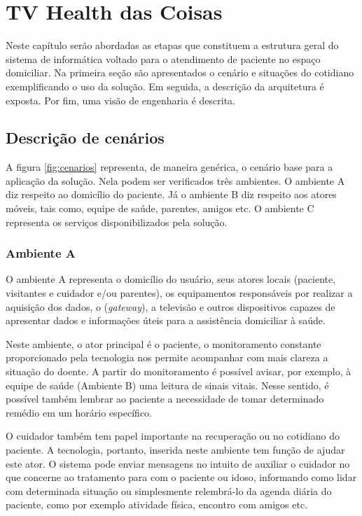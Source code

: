 \chapter{TV Health das Coisas}\label{cap:quatro}

Neste capítulo serão abordadas as etapas que constituem a estrutura geral do
sistema de informática voltado para o atendimento de paciente no espaço domiciliar. 
Na primeira seção são apresentados o cenário e situações do cotidiano exemplificando
o uso da solução. Em seguida, a descrição da arquitetura é exposta. Por fim, uma
visão de engenharia é descrita.

\section{Descrição de cenários}

A figura \ref{fig:cenarios} representa, de maneira genérica, o cenário base
para a aplicação da solução. Nela podem ser verificados três ambientes. O
ambiente A diz respeito ao domicílio do paciente. Já o ambiente B diz respeito
aos atores móveis, tais como, equipe de saúde, parentes, amigos etc. O ambiente
C representa os serviços disponibilizados pela solução.


\subsection{Ambiente A} \label{subsec:ambiente-a}

O ambiente A representa o domicílio do usuário, seus atores locais (paciente,
visitantes e cuidador e/ou parentes), os equipamentos responsáveis por  realizar
a aquisição dos dados, o \stb[] (\textit{gateway}), a televisão e outros
dispositivos capazes de apresentar dados e informações úteis para a assistência
domiciliar à saúde.

Neste ambiente, o ator principal é o paciente, o monitoramento constante 
proporcionado pela tecnologia nos permite acompanhar com mais clareza a situação
do doente. A partir do monitoramento é possível avisar, por exemplo, à equipe
de saúde (Ambiente B) uma leitura de sinais vitais. Nesse sentido, é possível 
também lembrar ao paciente a necessidade de tomar determinado remédio em um
horário específico.

O cuidador também tem papel importante na recuperação ou no cotidiano do 
paciente. A tecnologia, portanto, inserida neste ambiente tem função de ajudar
este ator. O sistema pode enviar mensagens no intuito de auxiliar o cuidador no
que concerne ao tratamento para com o paciente ou idoso, informando como lidar
com determinada situação ou simplesmente relembrá-lo da agenda diária do 
paciente, como por exemplo atividade física, encontro com amigos etc.

